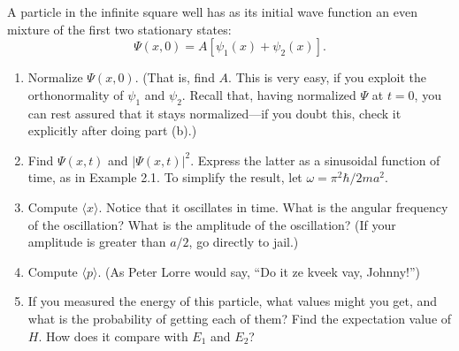 \documentclass[en, oneside]{vivi}
\begin{document}
\begin{prob}
    A particle in the infinite square well has as its initial wave function an even mixture of the first two stationary states:
    \begin{equation*}
        \Psi(x, 0) = A [\psi_1(x) + \psi_2(x)].
    \end{equation*}
    \begin{enumerate}[label=(\alph*)]
        \item Normalize $\Psi(x, 0)$. (That is, find $A$. This is very easy, if you exploit the orthonormality of $\psi_1$ and $\psi_2$. 
        Recall that, having normalized $\Psi$ at $t = 0$, you can rest assured that it stays normalized—if you doubt this, check it explicitly after doing part (b).)
        \item Find $\Psi(x, t)$ and $|\Psi(x, t)|^2$. Express the latter as a sinusoidal function of time, as in Example 2.1. 
        To simplify the result, let $\omega = \pi^2 \hbar / 2ma^2$.
        \item Compute $\langle x \rangle$. Notice that it oscillates in time. What is the angular frequency of the oscillation? 
        What is the amplitude of the oscillation? (If your amplitude is greater than $a/2$, go directly to jail.)
        \item Compute $\langle p \rangle$. (As Peter Lorre would say, “Do it ze kveek vay, Johnny!”)
        \item If you measured the energy of this particle, what values might you get, and what is the probability of getting each of them? 
        Find the expectation value of $H$. How does it compare with $E_1$ and $E_2$?
    \end{enumerate}
\end{prob}
\end{document}
